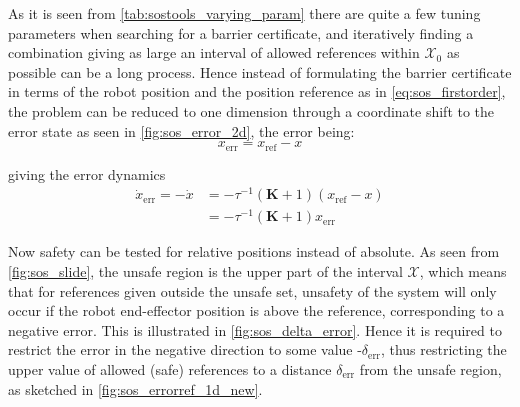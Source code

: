 As it is seen from \autoref{tab:sostools_varying_param} there are quite a few tuning parameters when searching for a barrier certificate, and iteratively finding a combination giving as large an interval of allowed references within $\mathcal{X}_0$ as possible can be a long process. %
Hence instead of formulating the barrier certificate in terms of the robot position and the position reference as in \autoref{eq:sos_firstorder}, the problem can be reduced to one dimension  through a coordinate shift to the error state as seen in \autoref{fig:sos_error_2d}, the error being: %
\vspace{-3mm}
\begin{equation*}
x_\text{err}=x_\text{ref}-x
\end{equation*}

\vspace{-5mm}
giving the error dynamics
\vspace{-3mm}
\begin{align}
\dot{x}_\text{err} = -\dot{x} &= -\tau^{-1}(\mathbf{K}+1)(x_\text{ref}-x) \nonumber\\
&= -\tau^{-1}(\mathbf{K}+1)x_\text{err}
\end{align}

\vspace{-2mm}
Now safety can  be tested for relative positions instead of absolute. 
As seen from \autoref{fig:sos_slide}, the unsafe region is the upper part of the interval $\mathcal{X}$, which means that for references given outside the unsafe set, unsafety of the system will only occur if the robot end-effector position is above the reference, corresponding to a negative error. This is illustrated in \autoref{fig:sos_delta_error}.
Hence it is required to restrict the error in the negative direction to some value -$\delta_\text{err}$, thus restricting the upper value of allowed (safe) references to a distance $\delta_\text{err}$ from the unsafe region, as sketched in \autoref{fig:sos_errorref_1d_new}. %

